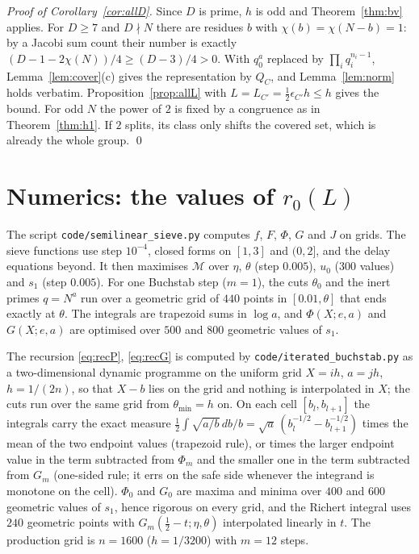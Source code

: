 \documentclass[11pt]{amsart}
\theoremstyle{remark}
\begin{document}
\emph{Proof of Corollary~\ref{cor:allD}.} Since $D$ is prime, $h$ is odd and Theorem~\ref{thm:bv} applies. For $D\ge7$ and $D\nmid N$ there are residues $b$ with $\chi(b)=\chi(N-b)=1$: by a Jacobi sum count their number is exactly $(D-1-2\chi(N))/4\ge(D-3)/4>0$. With $q_0^a$ replaced by $\prod_iq_i^{n_i-1}$, Lemma~\ref{lem:cover}(c) gives the representation by $Q_C$, and Lemma~\ref{lem:norm} holds verbatim. Proposition~\ref{prop:allL} with $L=L_{C'}=\frac12\epsilon_{C'}h\le h$ gives the bound. For odd $N$ the power of $2$ is fixed by a congruence as in Theorem~\ref{thm:h1}. If $2$ splits, its class only shifts the covered set, which is already the whole group. \qed

\section{Numerics: the values of \texorpdfstring{$r_0(L)$}{r0(L)}}\label{sec:num}
The script \texttt{code/semilinear\_sieve.py} computes $f$, $F$, $\Phi$, $G$ and $J$ on grids. The sieve functions use step $10^{-4}$, closed forms on $[1,3]$ and $(0,2]$, and the delay equations beyond. It then maximises $\mathcal M$ over $\eta$, $\theta$ (step $0.005$), $u_0$ (300 values) and $s_1$ (step $0.005$). For one Buchstab step ($m=1$), the cuts $\theta_0$ and the inert primes $q=N^a$ run over a geometric grid of $440$ points in $[0.01,\theta]$ that ends exactly at $\theta$. The integrals are trapezoid sums in $\log a$, and $\Phi(X;e,a)$ and $G(X;e,a)$ are optimised over $500$ and $800$ geometric values of $s_1$.

The recursion \eqref{eq:recP}, \eqref{eq:recG} is computed by \texttt{code/iterated\_buchstab.py} as a two-dimensional dynamic programme on the uniform grid $X=ih$, $a=jh$, $h=1/(2n)$, so that $X-b$ lies on the grid and nothing is interpolated in $X$; the cuts run over the same grid from $\theta_{\min}=h$ on. On each cell $[b_l,b_{l+1}]$ the integrals carry the exact measure $\frac12\int\sqrt{a/b}\,db/b=\sqrt a\,(b_l^{-1/2}-b_{l+1}^{-1/2})$ times the mean of the two endpoint values (trapezoid rule), or times the larger endpoint value in the term subtracted from $\Phi_m$ and the smaller one in the term subtracted from $G_m$ (one-sided rule; it errs on the safe side whenever the integrand is monotone on the cell). $\Phi_0$ and $G_0$ are maxima and minima over $400$ and $600$ geometric values of $s_1$, hence rigorous on every grid, and the Richert integral uses $240$ geometric points with $G_m(\frac12-t;\eta,\theta)$ interpolated linearly in $t$. The production grid is $n=1600$ ($h=1/3200$) with $m=12$ steps.
\end{document}
